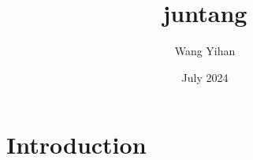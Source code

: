 \documentclass{article}
\title{juntang}
\author{Wang Yihan}
\date{July 2024}
\begin{document}
\maketitle

\section{Introduction}
\end{document}

